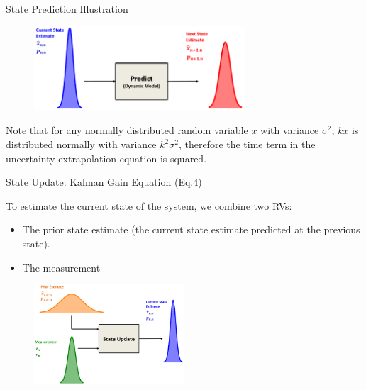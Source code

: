 \begin{frame}{State Prediction Illustration}
            \begin{figure}
		    \centering
		   \includegraphics[width=0.7\textwidth]{Figures/Chapter1/StatePredictionIllustration.png}
		    \label{fig:SatePrediction}
	    \end{figure}

    Note that for any normally distributed random variable $x$ with variance $\sigma^2$, $kx$ is distributed normally with variance $k^2\sigma^2$, therefore the time term in the uncertainty extrapolation equation is squared. 
\end{frame}
\begin{frame}{State Update: Kalman Gain Equation (Eq.4)}

To estimate the current state of the system, we combine two RVs:
    \begin{itemize}
        \item The prior state estimate (the current state estimate predicted at the previous state).
        \item The measurement
    \end{itemize}
    \begin{figure}
	 \centering
	 \includegraphics[width=0.5\textwidth]{Figures/Chapter1/StateUpdateIllustration.png}
	 \label{fig:SateUpdate}
    \end{figure}
\end{frame}

